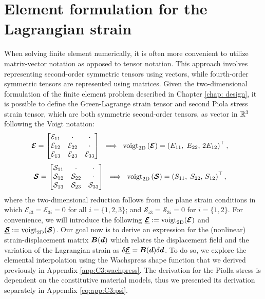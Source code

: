 \section{Element formulation for the Lagrangian strain}
\label{app:C3:straindisplacement} 
When solving finite element numerically, it is often more convenient to utilize matrix-vector notation as opposed to tensor notation. This approach involves representing second-order symmetric tensors using vectors, while fourth-order symmetric tensors are represented using matrices. Given the two-dimensional formulation of the finite element problem described in Chapter \ref{chap: design}, it is possible to define the Green-Lagrange strain tensor and second Piola stress strain tensor, which are both symmetric second-order tensors, as vector in $\mathbb{R}^3$ following the Voigt notation:
%
\begin{align}
\boldsymbol{\mathcal{E}} = \begin{bmatrix} 
\mathcal{E}_{11} & \cdot & \cdot \\
\mathcal{E}_{12} & \mathcal{E}_{22} & \cdot \\
\mathcal{E}_{13} & \mathcal{E}_{23} & \mathcal{E}_{33} 
\end{bmatrix}
 \;\; \Longrightarrow \;\;
\textrm{voigt}_{\textrm{2D}}\left( \boldsymbol{\mathcal{E}} \right) &= \left(E_{11},\; E_{22},\, 2E_{12} \right)^\top,
\end{align}
\begin{align}
\boldsymbol{\mathcal{S}} = \begin{bmatrix} 
\mathcal{S}_{11} & \cdot & \cdot \\
\mathcal{S}_{12} & \mathcal{S}_{22} & \cdot \\
\mathcal{S}_{13} & \mathcal{S}_{23} & \mathcal{S}_{33} 
\end{bmatrix}
    \;\; \Longrightarrow \;\;
\textrm{voigt}_{\textrm{2D}}\left( \boldsymbol{\mathcal{S}} \right) &= \left(S_{11},\; S_{22},\, S_{12} \right)^\top,
\end{align}
%
where the two-dimensional reduction follows from the plane strain conditions in which $\mathcal{E}_{i3} = \mathcal{E}_{3i} = 0$ for all $i = \{1,2,3\}$; and $\mathcal{S}_{i3} = \mathcal{S}_{3i} = 0$ for $i = \{1,2\}$. For convenience, we will introduce the following $\underline{\boldsymbol{\mathcal{E}}}:=\textrm{voigt}_{\textrm{2D}}(\boldsymbol{\mathcal{E}})$ and $\underline{\boldsymbol{\mathcal{S}}}:=\textrm{voigt}_{\textrm{2D}}(\boldsymbol{\mathcal{S}})$. Our goal now is to derive an expression for the (nonlinear) strain-displacement matrix ${\boldsymbol{B}}({\boldsymbol{d}})$ which relates the displacement field and the variation of the Lagrangian strain as $\delta \underline{{\boldsymbol{\mathcal{E}}}} = {\boldsymbol{B}}({\boldsymbol{d}}) \delta {\boldsymbol{d}}$. To do so, we explore the elemental interpolation using the Wachspress shape function that we derived previously in Appendix \ref{app:C3:wachpress}. The derivation for the Piolla stress is dependent on the constitutive material models, thus we presented its derivation separately in Appendix \ref{eq:app:C3:psi}.

